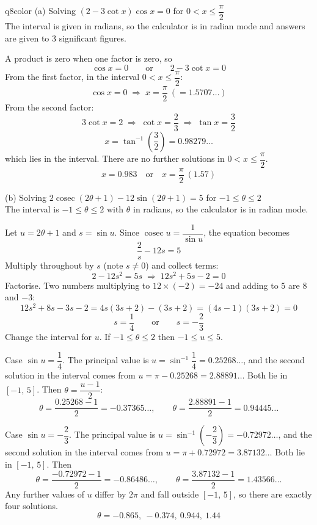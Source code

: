 \documentclass[11pt,a4paper]{article}
\DeclareMathOperator{\cosec}{cosec}
\begin{document}
\begin{ansbox}{q8color}
(a) Solving $(2 - 3\cot x)\cos x = 0$ for $0 < x \le \dfrac{\pi}{2}$\\[4pt]
The interval is given in radians, so the calculator is in radian mode and answers are given to 3 significant figures.

A product is zero when one factor is zero, so
\[
\cos x = 0 \qquad \text{or} \qquad 2 - 3\cot x = 0
\]
From the first factor, in the interval $0 < x \le \dfrac{\pi}{2}$:
\[
\cos x = 0 \;\Rightarrow\; x = \frac{\pi}{2} \ (= 1.5707\ldots)
\]
From the second factor:
\[
3\cot x = 2 \;\Rightarrow\; \cot x = \frac{2}{3} \;\Rightarrow\; \tan x = \frac{3}{2}
\]
\[
x = \tan^{-1}\!\left(\frac{3}{2}\right) = 0.98279\ldots
\]
which lies in the interval. There are no further solutions in $0 < x \le \dfrac{\pi}{2}$.
\[
\boxed{x = 0.983 \quad \text{or} \quad x = \frac{\pi}{2} \ (1.57)}
\]

(b) Solving $2\cosec(2\theta+1) - 12\sin(2\theta+1) = 5$ for $-1 \le \theta \le 2$\\[4pt]
The interval is $-1 \le \theta \le 2$ with $\theta$ in radians, so the calculator is in radian mode.

Let $u = 2\theta + 1$ and $s = \sin u$. Since $\cosec u = \dfrac{1}{\sin u}$, the equation becomes
\[
\frac{2}{s} - 12s = 5
\]
Multiply throughout by $s$ (note $s \ne 0$) and collect terms:
\[
2 - 12s^2 = 5s \;\Rightarrow\; 12s^2 + 5s - 2 = 0
\]
Factorise. Two numbers multiplying to $12 \times (-2) = -24$ and adding to $5$ are $8$ and $-3$:
\[
12s^2 + 8s - 3s - 2 = 4s(3s+2) - (3s+2) = (4s-1)(3s+2) = 0
\]
\[
s = \frac{1}{4} \qquad \text{or} \qquad s = -\frac{2}{3}
\]
Change the interval for $u$. If $-1 \le \theta \le 2$ then $-1 \le u \le 5$.

Case $\sin u = \dfrac{1}{4}$. The principal value is $u = \sin^{-1}\dfrac{1}{4} = 0.25268\ldots$, and the second solution in the interval comes from $u = \pi - 0.25268 = 2.88891\ldots$ Both lie in $[-1,\,5]$. Then $\theta = \dfrac{u-1}{2}$:
\[
\theta = \frac{0.25268 - 1}{2} = -0.37365\ldots, \qquad \theta = \frac{2.88891 - 1}{2} = 0.94445\ldots
\]

Case $\sin u = -\dfrac{2}{3}$. The principal value is $u = \sin^{-1}\!\left(-\dfrac{2}{3}\right) = -0.72972\ldots$, and the second solution in the interval comes from $u = \pi + 0.72972 = 3.87132\ldots$ Both lie in $[-1,\,5]$. Then
\[
\theta = \frac{-0.72972 - 1}{2} = -0.86486\ldots, \qquad \theta = \frac{3.87132 - 1}{2} = 1.43566\ldots
\]
Any further values of $u$ differ by $2\pi$ and fall outside $[-1,\,5]$, so there are exactly four solutions.
\[
\boxed{\theta = -0.865,\ -0.374,\ 0.944,\ 1.44}
\]
\end{ansbox}
\end{document}
